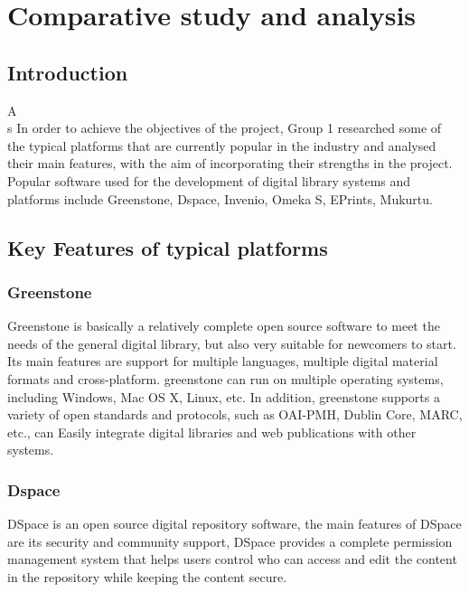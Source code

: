 \chapter{Comparative study and analysis}

\section*{Introduction}

\lettrine[lines=2]{A}\\s In order to achieve the objectives of the project, Group 1 researched some of the typical platforms that are currently popular in the industry and analysed their main features, with the aim of incorporating their strengths in the project. Popular software used for the development of digital library systems and platforms include Greenstone, Dspace, Invenio, Omeka S, EPrints, Mukurtu.

\section{Key Features of typical platforms}

\subsection{Greenstone}

Greenstone is basically a relatively complete open source software to meet the needs of the general digital library, but also very suitable for newcomers to start. Its main features are support for multiple languages, multiple digital material formats and cross-platform. greenstone can run on multiple operating systems, including Windows, Mac OS X, Linux, etc. In addition, greenstone supports a variety of open standards and protocols, such as OAI-PMH, Dublin Core, MARC, etc., can Easily integrate digital libraries and web publications with other systems.



\subsection{Dspace}

DSpace is an open source digital repository software, the main features of DSpace are its security and community support, DSpace provides a complete permission management system that helps users control who can access and edit the content in the repository while keeping the content secure\cite{DSpaceIn8:online}. 

